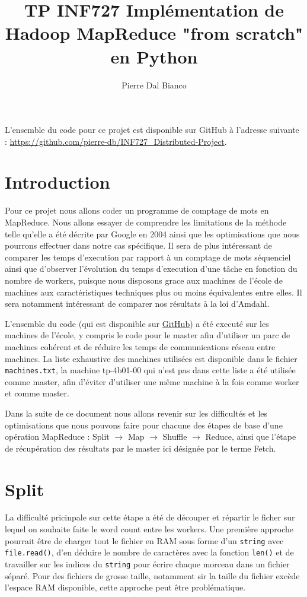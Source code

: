 \documentclass[11pt,a4paper]{article}
\title{TP INF727 \textbf{Implémentation de Hadoop MapReduce "from scratch" en Python}}
\author{Pierre Dal Bianco}
\date{}
\begin{document}
\maketitle
\hrulefill

L'ensemble du code pour ce projet est disponible sur GitHub à l'adresse suivante : \url{https://github.com/pierre-db/INF727_Distributed-Project}.

\section*{Introduction}
Pour ce projet nous allons coder un programme de comptage de mots en MapReduce. Nous allons essayer de comprendre les limitations de la méthode telle qu'elle a été décrite par Google en 2004 ainsi que les optimisations que nous pourrons effectuer dans notre cas spécifique. Il sera de plus intéressant de comparer les temps d'execution par rapport à un comptage de mots séquenciel ainsi que d'observer l'évolution du temps d'execution d'une tâche en fonction du nombre de workers, puisque nous disposons grace aux machines de l'école de machines aux caractéristiques techniques plus ou moins équivalentes entre elles. Il sera notamment intéressant de comparer nos résultats à la loi d'Amdahl.

L'ensemble du code (qui est disponible sur \href{https://github.com/pierre-db/INF727_Distributed-Project}{GitHub}) a été executé sur les machines de l'école, y compris le code pour le master afin d'utiliser un parc de machines cohérent et de réduire les temps de communications réseau entre machines. La liste exhaustive des machines utilisées est disponible dans le fichier \texttt{machines.txt}, la machine tp-4b01-00 qui n'est pas dans cette liste a été utilisée comme master, afin d'éviter d'utiliser une même machine à la fois comme worker et comme master.

Dans la suite de ce document nous allons revenir sur les difficultés et les optimisations que nous pouvons faire pour chacune des étapes de base d'une opération MapReduce : Split $\rightarrow$ Map $\rightarrow$ Shuffle $\rightarrow$ Reduce, ainsi que l'étape de récupération des résultats par le master ici désignée par le terme Fetch.

\section{Split}
La difficulté pricinpale sur cette étape a été de découper et répartir le ficher sur lequel on souhaite faite le word count entre les workers. Une première approche pourrait être de charger tout le fichier en RAM sous forme d'un \texttt{string} avec \texttt{file.read()}, d'en déduire le nombre de caractères avec la fonction \texttt{len()} et de travailler sur les indices du \texttt{string} pour écrire chaque morceau dans un fichier séparé. Pour des fichiers de grosse taille, notamment sir la taille du fichier excède l'espace RAM disponible, cette approche peut être problématique.
\end{document}
